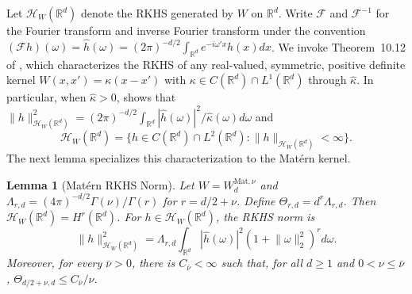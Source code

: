 \documentclass[letterpaper,12pt]{article}
\newtheorem{lem}[thm]{Lemma}
\theoremstyle{definition}
\numberwithin{equation}{section}
\newcommand{\mc}{\mathcal}
\newcommand{\norm}[1]{\lVert#1\rVert}
\begin{document}
Let $\mc H_W(\mathbb R^d)$ denote the RKHS generated by $W$ on $\mathbb R^d$.
Write $\mathcal F$ and $\mathcal F^{-1}$ for the Fourier transform and inverse Fourier transform under the convention $(\mathcal F h)(\omega)=\widehat h(\omega)=(2\pi)^{-d/2}\int_{\mathbb R^d}e^{-i\omega'x}h(x)dx$.
We invoke Theorem~10.12 of \citet{wendland2005scattered}, which characterizes the RKHS of any real-valued, symmetric, positive definite kernel $W(x,x')=\kappa(x-x')$ with $\kappa\in C(\mathbb R^d)\cap L^1(\mathbb R^d)$ through $\widehat\kappa$. In particular, when $\widehat\kappa>0$, \citet{wendland2005scattered} shows that $\norm{h}_{\mc H_W(\mathbb R^d)}^2=(2\pi)^{-d/2}\int_{\mathbb R^d}|\widehat h(\omega)|^2/\widehat\kappa(\omega)d\omega$ and
\begin{equation}\label{equation:proof-wendland-characterization}
\mc H_W(\mathbb R^d)=\bigg\{h\in C(\mathbb R^d)\cap L^2(\mathbb R^d):\norm{h}_{\mc H_W(\mathbb R^d)}<\infty\bigg\}.
\end{equation}
The next lemma specializes this characterization to the Mat\'ern kernel.

\begin{lem}[Mat\'ern RKHS Norm]\label{lemma:proof-matern-native-norm}
Let $W=W_d^{\mathrm{Mat},\nu}$ and $\Lambda_{r,d}=(4\pi)^{-d/2}\Gamma(\nu)/\Gamma(r)$ for $r=d/2+\nu$.
Define $\Theta_{r,d}=d^r\Lambda_{r,d}$.
Then $\mc H_W(\mathbb R^d)=H^r(\mathbb R^d)$.
For $h\in\mc H_W(\mathbb R^d)$, the RKHS norm is
\begin{equation}\label{equation:proof-matern-native-norm}
\norm{h}_{\mc H_W(\mathbb R^d)}^2=\Lambda_{r,d}\int_{\mathbb R^d}|\widehat h(\omega)|^2(1+\norm{\omega}_2^2)^r d\omega.
\end{equation}
Moreover, for every $\bar\nu>0$, there is $C_{\bar\nu}<\infty$ such that, for all $d\geq1$ and $0<\nu\leq\bar\nu$, $\Theta_{d/2+\nu,d}\leq C_{\bar\nu}/\nu$.
\end{lem}
\end{document}

